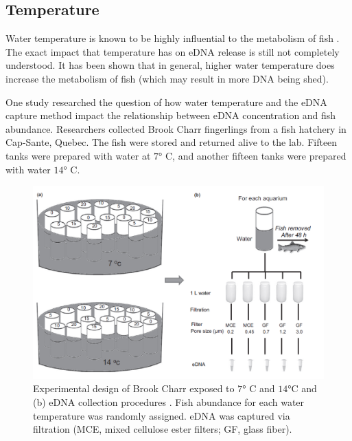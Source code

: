 \newpage



\subsection{Temperature}

Water temperature is known to be highly influential to the metabolism of fish \citep{tempmet}. The exact impact that temperature has on eDNA release is still not completely understood. It has been shown that in general, higher water temperature does increase the metabolism of fish (which may result in more DNA being shed).

\vspace{5mm}

 One study \citep{fishabundance} researched the question of how water temperature and the eDNA capture method impact the relationship between eDNA concentration and fish abundance. Researchers collected Brook Charr fingerlings from a fish hatchery in Cap-Sante, Quebec.  The fish were stored and returned alive to the lab. Fifteen tanks were prepared with water at $\ang{7}$ C, and another fifteen tanks were prepared with water $\ang{14}$ C.


\begin{figure}[H]
\includegraphics[scale=0.5]{Chapter2Images/brookchar.png}
\caption{Experimental design of Brook Charr exposed to $\ang{7 }$ C and $\ang{14}$C and (b) eDNA collection procedures  \citep{fishabundance}. Fish abundance for each
water temperature was randomly assigned. eDNA was captured via filtration (MCE, mixed cellulose ester filters; GF, glass fiber).}
\label{fig:brookchar}
\end{figure}

